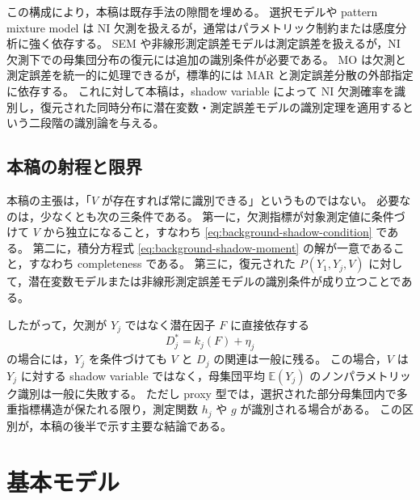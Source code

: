 \documentclass[dvipdfmx,autodetect-engine]{jsarticle}
\newcommand{\E}{\mathbb{E}}
\newcommand{\1}{\mathbf{1}}
\begin{document}
この構成により，本稿は既存手法の隙間を埋める。
選択モデルや pattern mixture model は NI 欠測を扱えるが，通常はパラメトリック制約または感度分析に強く依存する。
SEM や非線形測定誤差モデルは測定誤差を扱えるが，NI 欠測下での母集団分布の復元には追加の識別条件が必要である。
MO は欠測と測定誤差を統一的に処理できるが，標準的には MAR と測定誤差分散の外部指定に依存する。
これに対して本稿は，shadow variable によって NI 欠測確率を識別し，復元された同時分布に潜在変数・測定誤差モデルの識別定理を適用するという二段階の識別論を与える。

\subsection{本稿の射程と限界}

本稿の主張は，「$V$ が存在すれば常に識別できる」というものではない。
必要なのは，少なくとも次の三条件である。
第一に，欠測指標が対象測定値に条件づけて $V$ から独立になること，すなわち \eqref{eq:background-shadow-condition} である。
第二に，積分方程式 \eqref{eq:background-shadow-moment} の解が一意であること，すなわち completeness である。
第三に，復元された $P(Y_1,Y_j,V)$ に対して，潜在変数モデルまたは非線形測定誤差モデルの識別条件が成り立つことである。

したがって，欠測が $Y_j$ ではなく潜在因子 $F$ に直接依存する
\begin{equation}
  D_j^*=k_j(F)+\eta_j
  \label{eq:background-f-dependent-missing}
\end{equation}
の場合には，$Y_j$ を条件づけても $V$ と $D_j$ の関連は一般に残る。
この場合，$V$ は $Y_j$ に対する shadow variable ではなく，母集団平均 $\E(Y_j)$ のノンパラメトリック識別は一般に失敗する。
ただし proxy 型では，選択された部分母集団内で多重指標構造が保たれる限り，測定関数 $h_j$ や $g$ が識別される場合がある。
この区別が，本稿の後半で示す主要な結論である。
\section{基本モデル}
\end{document}
